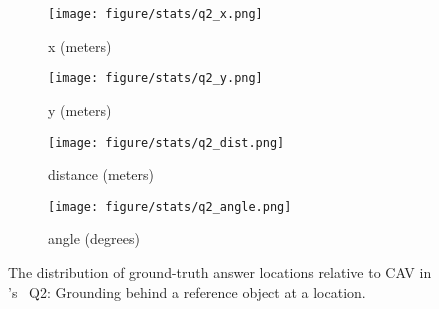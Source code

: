 \begin{figure}[!t]
        \centering
        \begin{subfigure}[t]{0.23\textwidth}
            \centering 
            \texttt{[image: figure/stats/q2\_x.png]}
            \vspace{-20pt}
            \caption[]%
            {{x (meters)}}    
        \end{subfigure}
        \hfill
        \begin{subfigure}[t]{0.23\textwidth}  
            \centering 
            \texttt{[image: figure/stats/q2\_y.png]}
            \vspace{-20pt}
            \caption[]%
            {{y (meters)}}
        \end{subfigure}

        \begin{subfigure}[t]{0.23\textwidth}
            \centering 
            \texttt{[image: figure/stats/q2\_dist.png]}
            \vspace{-20pt}
            \caption[]%
            {{distance (meters)}}
        \end{subfigure}
        \hfill
        \begin{subfigure}[t]{0.23\textwidth}
            \centering 
            \texttt{[image: figure/stats/q2\_angle.png]}
            \vspace{-20pt}
            \caption[]%
            {{angle (degrees)}}
        \end{subfigure}
        \hfill
        
        \vspace{-10pt}
        \caption[]
        {
        The distribution of ground-truth answer locations relative to CAV in \namedataset's \namevsplit~Q2: Grounding behind a reference object at a location. 
        } 
        \label{fig:stats_v2v_q2}
        \vspace{-10pt}
\end{figure}

